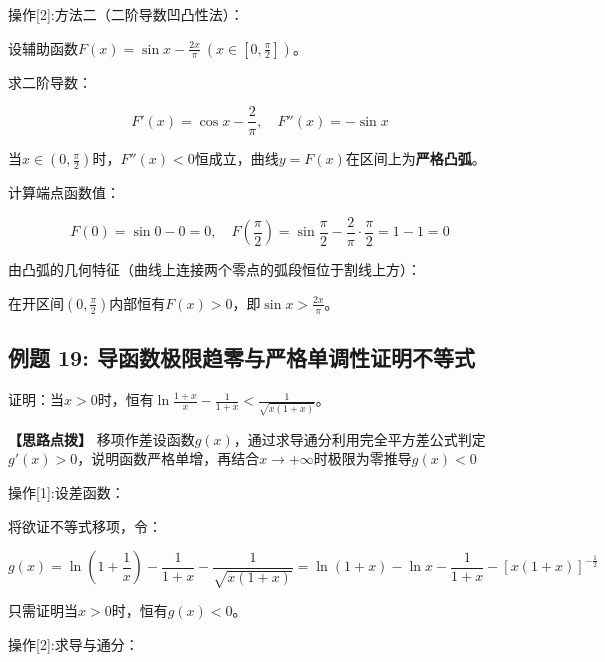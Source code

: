 \documentclass[11pt,a4paper,UTF8]{ctexart}
\begin{document}
操作[2]:方法二（二阶导数凹凸性法）：

\begin{solbox}[分步推导与答题规范]
设辅助函数$F(x) = \sin x - \frac{2x}{\pi}\ \left(x \in \left[0, \frac{\pi}{2}\right]\right)$。

求二阶导数：


\begin{equation*}
F'(x) = \cos x - \frac{2}{\pi}, \quad F''(x) = -\sin x
\end{equation*}


当$x \in \left(0, \frac{\pi}{2}\right)$时，$F''(x) < 0$恒成立，曲线$y = F(x)$在区间上为\textbf{严格凸弧}。

计算端点函数值：


\begin{equation*}
F(0) = \sin 0 - 0 = 0, \quad F\left(\frac{\pi}{2}\right) = \sin\frac{\pi}{2} - \frac{2}{\pi} \cdot \frac{\pi}{2} = 1 - 1 = 0
\end{equation*}


由凸弧的几何特征（曲线上连接两个零点的弧段恒位于割线上方）：

在开区间$\left(0, \frac{\pi}{2}\right)$内部恒有$F(x) > 0$，即$\sin x > \frac{2x}{\pi}$。
\end{solbox}


\subsection{例题 19: 导函数极限趋零与严格单调性证明不等式}

证明：当$x > 0$时，恒有$\ln\frac{1+x}{x} - \frac{1}{1+x} < \frac{1}{\sqrt{x(1+x)}}$。

\textbf{\color{DeepPurple}【思路点拨】} 移项作差设函数$g(x)$，通过求导通分利用完全平方差公式判定$g'(x) > 0$，说明函数严格单增，再结合$x \to +\infty$时极限为零推导$g(x) < 0$


操作[1]:设差函数：

\begin{solbox}[分步推导与答题规范]
将欲证不等式移项，令：


\begin{equation*}
g(x) = \ln\left(1 + \frac{1}{x}\right) - \frac{1}{1+x} - \frac{1}{\sqrt{x(1+x)}} = \ln(1+x) - \ln x - \frac{1}{1+x} - [x(1+x)]^{-\frac{1}{2}}
\end{equation*}


只需证明当$x > 0$时，恒有$g(x) < 0$。
\end{solbox}

操作[2]:求导与通分：
\end{document}
